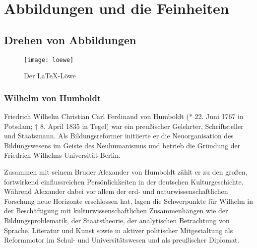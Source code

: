 
\chapter{Abbildungen und die Feinheiten}
\section{Drehen von Abbildungen}


\begin{figure}[h]
	\texttt{[image: loewe]}
	\caption{Der \LaTeX-Löwe}
	\label{fig:loewe}
\end{figure}


\newcommand\mysideref[1]{\\marginnote{Abb.\ref{fig:#1}}}%


\subsection{Wilhelm von Humboldt}


Friedrich Wilhelm Christian Carl Ferdinand von Humboldt (* 22. Juni 1767 in Potsdam; † 8. April 1835 in Tegel) war ein preußischer Gelehrter, Schriftsteller und Staatsmann. Als Bildungsreformer initiierte er die Neuorganisation des Bildungswesens im Geiste des Neuhumanismus und betrieb die Gründung der Friedrich-Wilhelms-Universität Berlin.

Zusammen mit seinem Bruder Alexander von Humboldt zählt er zu den großen, fortwirkend einflussreichen Persönlichkeiten in der deutschen Kulturgeschichte. Während Alexander dabei vor allem der erd- und naturwissenschaftlichen Forschung neue Horizonte erschlossen hat, lagen die Schwerpunkte für Wilhelm in der Beschäftigung mit kulturwissenschaftlichen Zusammenhängen wie der Bildungsproblematik, der Staatstheorie, der analytischen Betrachtung von Sprache, Literatur und Kunst sowie in aktiver politischer Mitgestaltung als Reformmotor im Schul- und Universitätswesen und als preußischer Diplomat.

